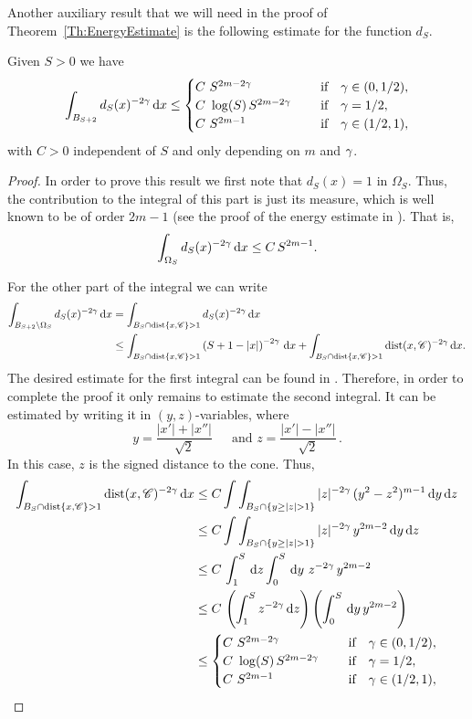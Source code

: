 Another auxiliary result that we will need in the proof of Theorem~\ref{Th:EnergyEstimate} is the following estimate for the function $d_S$. 

\begin{lemma}
\label{Lemma: Integrability_dFunction}
Given $S>0$ we have
$$ \int_{B_{S+2}} d_S(x)^{-2\gamma} \,\mathrm{d} x \leq \begin{cases}
C \ S^{2m-2\gamma}\ \ \ \ &\textrm{if } \ \ \gamma\in(0,1/2),\\
C\ \log(S)\,S^{2m-2\gamma}\ \ \ \ &\textrm{if } \ \ \gamma=1/2,\\
C \ S^{2m-1}\ \ \ \ &\textrm{if } \ \ \gamma\in(1/2,1),\\
\end{cases} $$
with $C>0$ independent of $S$ and only depending on $m$ and $\gamma$.
\end{lemma}

\begin{proof}
In order to prove this result we first note that $d_S(x)=1$ in $\Omega_S$. Thus, the contribution to the integral of this part is just its measure, which is well known to be of order $2m-1$ (see the proof of the energy estimate in \cite{CabreTerraI}). That is,
$$\int_{\Omega_S} d_S(x)^{-2\gamma} \,\mathrm{d} x \leq C\,S^{2m-1}.$$

For the other part of the integral we can write
\begin{align*}
\int_{B_{S+2}\setminus \Omega_S} d_S(x)^{-2\gamma} \,\mathrm{d} x &= \int_{B_{S}\cap \operatorname{dist}\{x,\mathscr{C}\}>1} d_S(x)^{-2\gamma} \,\mathrm{d} x \\
& \leq \int_{B_{S}\cap \operatorname{dist}\{x,\mathscr{C}\}>1} \left( S+1-|x| \right)^{-2\gamma} \,\mathrm{d} x + \int_{B_{S}\cap \operatorname{dist}\{x,\mathscr{C}\}>1} \operatorname{dist}(x,\mathscr{C})^{-2\gamma} \,\mathrm{d} x.
\end{align*}
The desired estimate for the first integral can be found in \cite{SavinValdinoci-EnergyEstimate}. Therefore, in order to complete the proof it only remains to estimate the second integral. It can be estimated by writing it in $(y,z)$-variables, where
$$
y = \dfrac{|x'|+|x''|}{\sqrt{2}} \, \quad \text{ and } z = \dfrac{|x'|-|x''|}{\sqrt{2}}\,.
$$
In this case, $z$ is the signed distance to the cone. Thus,
\begin{align*}
\int_{B_{S}\cap \dist\{x,\ccal\}>1} \dist(x,\ccal)^{-2\s} \d x &\leq C \int \int_{B_{S}\cap \{y\geq|z|>1\}} |z|^{-2\s} \, (y^2-z^2)^{m-1} \d y\d z \\
& \leq C \int \int_{B_{S}\cap \{y\geq|z|>1\}} |z|^{-2\s} \, y^{2m-2} \d y\d z \\
& \leq C\, \int_1^S \d z \int_0^S \d y\ z^{-2\s} \, y^{2m-2} \\
& \leq C\, \left(\int_1^S z^{-2\s} \d z \right)  \left(  \int_0^S \d y \, y^{2m-2} \right) \\
& \leq \begin{cases}
C \ S^{2m-2\s}\ \ \ \ &\textrm{if } \ \ \s\in(0,1/2),\\
C\ \log(S)\,S^{2m-2\s}\ \ \ \ &\textrm{if } \ \ \s=1/2,\\
C \ S^{2m-1}\ \ \ \ &\textrm{if } \ \ \s\in(1/2,1),\\
\end{cases}
\end{align*}
\end{proof}


